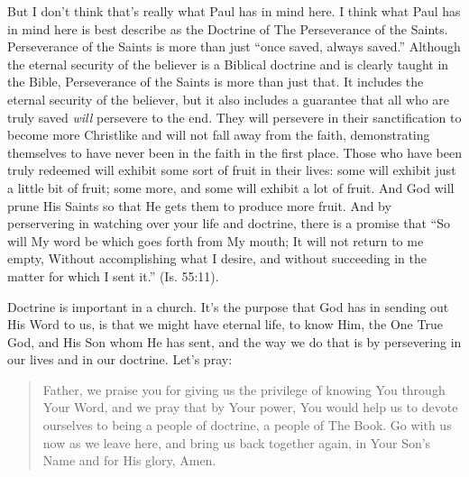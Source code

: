 \documentclass[letterpaper, 12pt]{article}
\begin{document}
    But I don't think that's really what Paul has in mind here. I think
    what Paul has in mind here is best describe as the Doctrine of The
    Perseverance of the Saints. Perseverance of the Saints is more than
    just ``once saved, always saved.'' Although the eternal security of
    the believer is a Biblical doctrine and is clearly taught in the
    Bible, Perseverance of the Saints is more than just that. It
    includes the eternal security of the believer, but it also includes
    a guarantee that all who are truly saved \emph{will} persevere to
    the end. They will persevere in their sanctification to become more
    Christlike and will not fall away from the faith, demonstrating
    themselves to have never been in the faith in the first place. Those
    who have been truly redeemed will exhibit some sort of fruit in
    their lives: some will exhibit just a little bit of fruit; some
    more, and some will exhibit a lot of fruit. And God will prune His
    Saints so that He gets them to produce more fruit. And by
    perservering in watching over your life and doctrine, there is a
    promise that ``So will My word be which goes forth from My mouth; It
    will not return to me empty, Without accomplishing what I desire,
    and without succeeding in the matter for which I sent it.'' (Is.
    55:11).

    Doctrine is important in a church. It's the purpose that God has in
    sending out His Word to us, is that we might have eternal life, to
    know Him, the One True God, and His Son whom He has sent, and the
    way we do that is by persevering in our lives and in our doctrine.
    Let's pray:

    \begin{quote}

        Father, we praise you for giving us the privilege of knowing You
        through Your Word, and we pray that by Your power, You would
        help us to devote ourselves to being a people of doctrine, a
        people of The Book. Go with us now as we leave here, and bring
        us back together again, in Your Son's Name and for His glory,
        Amen.

    \end{quote}
\end{document}
